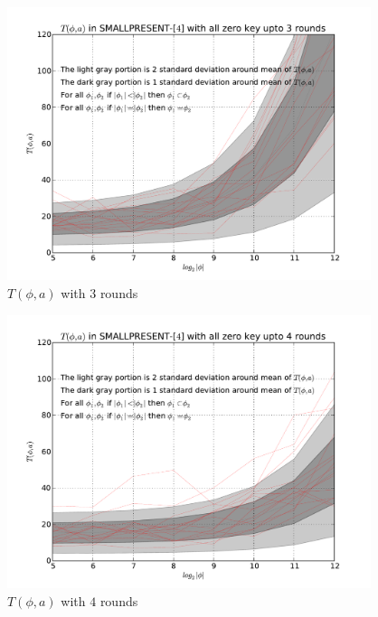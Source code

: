 \begin{figure}[h!]
    \centering
    \includegraphics[width=\textwidth , height = 8cm]{images/T_a_phi_variable_a_varible_phi_variable_size_03rounds}
    \caption{$T(\phi,a)$ with $3$ rounds}
    \label{fig:T_a_phi_variable_a_varible_phi_variable_size_03rounds}
\end{figure}

\begin{figure}[h!]
    \centering
    \includegraphics[width=\textwidth , height = 8cm]{images/T_a_phi_variable_a_varible_phi_variable_size_04rounds}
    \caption{$T(\phi,a)$ with $4$ rounds}
    \label{fig:T_a_phi_variable_a_varible_phi_variable_size_04rounds}
\end{figure}

